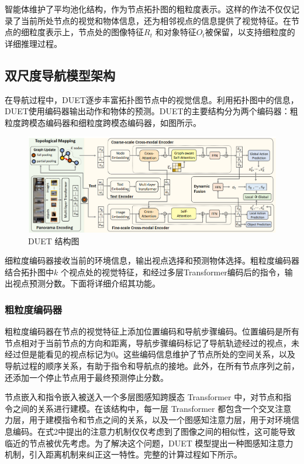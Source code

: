 \documentclass[bachelor]{thesis-uestc}
\begin{document}
智能体维护了平均池化结构，作为节点拓扑图的粗粒度表示。这样的作法不仅仅记录了当前所处节点的视觉和物体信息，还为相邻视点的信息提供了视觉特征。在节点的细粒度表示上，节点处的图像特征$R_t$ 和对象特征$O_t$被保留，以支持细粒度的详细推理过程。

\subsection{双尺度导航模型架构}

在导航过程中，DUET逐步丰富拓扑图节点中的视觉信息。利用拓扑图中的信息，DUET使用编码器输出动作和物体的预测。DUET的主要结构分为两个编码器：粗粒度跨模态编码器和细粒度跨模态编码器，如图所示。

\begin {figure}[h]
\centering %
\includegraphics[width=\textwidth]{0242-042816.png}
\caption{DUET 结构图} %
\label{duet}
\end {figure}

细粒度编码器接收当前的环境信息，输出视点选择和预测物体选择。粗粒度编码器结合拓扑图中$k$ 个视点处的视觉特征，和经过多层Transformer编码后的指令，输出视点预测分数。下面将详细介绍其功能。

\subsubsection{粗粒度编码器}

粗粒度编码器在节点的视觉特征上添加位置编码和导航步骤编码。位置编码是所有节点相对于当前节点的方向和距离，导航步骤编码标记了导航轨迹经过的视点，未经过但是能看见的视点标记为0。这些编码信息维护了节点所处的空间关系，以及导航过程的顺序关系，有助于指令和导航点的接地。此外，在所有节点序列之前，还添加一个停止节点用于最终预测停止分数。

节点嵌入和指令嵌入被送入一个多层图感知跨膜态 Transformer 中，对节点和指令之间的关系进行建模。在该结构中，每一层 Transformer 都包含一个交叉注意力层，用于建模指令和节点之间的关系，以及一个图感知注意力层，用于对环境信息编码。在式2中提出的注意力机制仅仅考虑到了图像之间的相似性，这可能导致临近的节点被优先考虑。为了解决这个问题，DUET 模型提出一种图感知注意力机制，引入距离机制来纠正这一特性。完整的计算过程如下所示。
\end{document}
